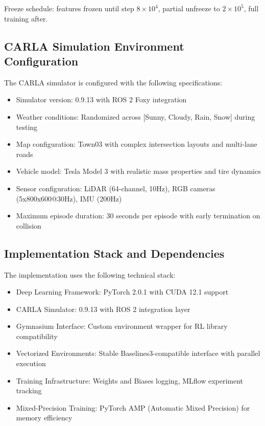 \documentclass[10pt,twocolumn,letterpaper]{article}
\begin{document}
\noindent Freeze schedule: features frozen until step $8\times10^4$, partial unfreeze to $2\times10^5$, full training after.

\subsection{CARLA Simulation Environment Configuration}

The CARLA simulator is configured with the following specifications:
\begin{itemize}
    \item Simulator version: 0.9.13 with ROS 2 Foxy integration
    \item Weather conditions: Randomized across [Sunny, Cloudy, Rain, Snow] during testing
    \item Map configuration: Town03 with complex intersection layouts and multi-lane roads
    \item Vehicle model: Tesla Model 3 with realistic mass properties and tire dynamics
    \item Sensor configuration: LiDAR (64-channel, 10Hz), RGB cameras (5x800x600@30Hz), IMU (200Hz)
    \item Maximum episode duration: 30 seconds per episode with early termination on collision
\end{itemize}

\subsection{Implementation Stack and Dependencies}

The implementation uses the following technical stack:
\begin{itemize}
    \item Deep Learning Framework: PyTorch 2.0.1 with CUDA 12.1 support
    \item CARLA Simulator: 0.9.13 with ROS 2 integration layer
    \item Gymnasium Interface: Custom environment wrapper for RL library compatibility
    \item Vectorized Environments: Stable Baselines3-compatible interface with parallel execution
    \item Training Infrastructure: Weights and Biases logging, MLflow experiment tracking
    \item Mixed-Precision Training: PyTorch AMP (Automatic Mixed Precision) for memory efficiency
\end{itemize}
\end{document}
